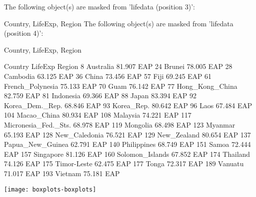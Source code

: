 \begin{Schunk}
\begin{Soutput}
The following object(s) are masked from 'lifedata (position 3)':

    Country, LifeExp, Region
The following object(s) are masked from 'lifedata (position 4)':

    Country, LifeExp, Region
\end{Soutput}
\begin{Soutput}
                 Country LifeExp Region
8              Australia  81.907    EAP
24                Brunei  78.005    EAP
28              Cambodia  63.125    EAP
36                 China  73.456    EAP
57                  Fiji  69.245    EAP
61      French_Polynesia  75.133    EAP
70                  Guam  76.142    EAP
77       Hong_Kong_China  82.759    EAP
81             Indonesia  69.366    EAP
88                 Japan  83.394    EAP
92       Korea_Dem._Rep.  68.846    EAP
93            Korea_Rep.  80.642    EAP
96                  Laos  67.484    EAP
104          Macao_China  80.934    EAP
108             Malaysia  74.221    EAP
117 Micronesia_Fed._Sts.  68.978    EAP
119             Mongolia  68.498    EAP
123              Myanmar  65.193    EAP
128        New_Caledonia  76.521    EAP
129          New_Zealand  80.654    EAP
137     Papua_New_Guinea  62.791    EAP
140          Philippines  68.749    EAP
151                Samoa  72.444    EAP
157            Singapore  81.126    EAP
160      Solomon_Islands  67.852    EAP
174             Thailand  74.126    EAP
175          Timor-Leste  62.475    EAP
177                Tonga  72.317    EAP
189              Vanuatu  71.017    EAP
193              Vietnam  75.181    EAP
\end{Soutput}
\end{Schunk}
\texttt{[image: boxplots-boxplots]}
